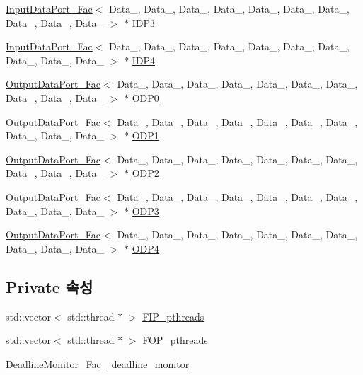 \begin{DoxyCompactItemize}
\item 
\hyperlink{classInputDataPort__Fac}{Input\+Data\+Port\+\_\+\+Fac}$<$ Data\+\_, Data\+\_, Data\+\_, Data\+\_, Data\+\_, Data\+\_, Data\+\_, Data\+\_, Data\+\_, Data\+\_ $>$ $\ast$ \hyperlink{classFactory_a67c4448f7c694be4e12739d2d3cd7910}{I\+D\+P3}
\item 
\hyperlink{classInputDataPort__Fac}{Input\+Data\+Port\+\_\+\+Fac}$<$ Data\+\_, Data\+\_, Data\+\_, Data\+\_, Data\+\_, Data\+\_, Data\+\_, Data\+\_, Data\+\_, Data\+\_ $>$ $\ast$ \hyperlink{classFactory_a965146b854acde70e6a7ca1095e44526}{I\+D\+P4}
\item 
\hyperlink{classOutputDataPort__Fac}{Output\+Data\+Port\+\_\+\+Fac}$<$ Data\+\_, Data\+\_, Data\+\_, Data\+\_, Data\+\_, Data\+\_, Data\+\_, Data\+\_, Data\+\_, Data\+\_ $>$ $\ast$ \hyperlink{classFactory_a3644b51b1cfbe7385523ab9f08dac1a6}{O\+D\+P0}
\item 
\hyperlink{classOutputDataPort__Fac}{Output\+Data\+Port\+\_\+\+Fac}$<$ Data\+\_, Data\+\_, Data\+\_, Data\+\_, Data\+\_, Data\+\_, Data\+\_, Data\+\_, Data\+\_, Data\+\_ $>$ $\ast$ \hyperlink{classFactory_a15fbd1b09238bdd01967b10fd20136d8}{O\+D\+P1}
\item 
\hyperlink{classOutputDataPort__Fac}{Output\+Data\+Port\+\_\+\+Fac}$<$ Data\+\_, Data\+\_, Data\+\_, Data\+\_, Data\+\_, Data\+\_, Data\+\_, Data\+\_, Data\+\_, Data\+\_ $>$ $\ast$ \hyperlink{classFactory_a1a6a173fb03250b269320d772fb0855a}{O\+D\+P2}
\item 
\hyperlink{classOutputDataPort__Fac}{Output\+Data\+Port\+\_\+\+Fac}$<$ Data\+\_, Data\+\_, Data\+\_, Data\+\_, Data\+\_, Data\+\_, Data\+\_, Data\+\_, Data\+\_, Data\+\_ $>$ $\ast$ \hyperlink{classFactory_a0b72fe47a8a15af6f9dfdeb46c4bc3fc}{O\+D\+P3}
\item 
\hyperlink{classOutputDataPort__Fac}{Output\+Data\+Port\+\_\+\+Fac}$<$ Data\+\_, Data\+\_, Data\+\_, Data\+\_, Data\+\_, Data\+\_, Data\+\_, Data\+\_, Data\+\_, Data\+\_ $>$ $\ast$ \hyperlink{classFactory_a3a94566e0097a4f38401c0d7d11750b1}{O\+D\+P4}
\end{DoxyCompactItemize}
\subsection*{Private 속성}
\begin{DoxyCompactItemize}
\item 
std\+::vector$<$ std\+::thread $\ast$ $>$ \hyperlink{classFactory_a10eeb0e3620d248a5f500ab923e1bd4c}{F\+I\+P\+\_\+pthreads}
\item 
std\+::vector$<$ std\+::thread $\ast$ $>$ \hyperlink{classFactory_adef777708bab91c0dc6a20eba43c3e1e}{F\+O\+P\+\_\+pthreads}
\item 
\hyperlink{classDeadlineMonitor__Fac}{Deadline\+Monitor\+\_\+\+Fac} \hyperlink{classFactory_a4297ef21a23413ade2d0a528582c9946}{\+\_\+deadline\+\_\+monitor}
\end{DoxyCompactItemize}


